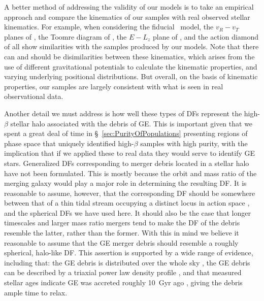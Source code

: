 A better method of addressing the validity of our models is to take an empirical approach and compare the kinematics of our samples with real observed stellar kinematics. For example, when considering the fiducial \survey\ model, the $v_{R}-v_{T}$ planes of \citet{belokurov18,fattahi19,naidu20}, the Toomre diagram of \citet{helmi18,koppelman19b}, the $E-L_{z}$ plane of \citet{helmi18,koppelman19b,naidu20}, and the action diamond of \citep[normalized to be a circle, ][]{naidu20} all show similarities with the samples produced by our models. Note that there can and should be disimilarities between these kinematics, which arises from the use of different gravitational potentials to calculate the kinematic properties, and varying underlying positional distributions. But overall, on the basis of kinematic properties, our samples are largely consistent with what is seen in real observational data.

Another detail we must address is how well these types of DFs represent the high-$\beta$ stellar halo associated with the debris of GE. This is important given that we spent a great deal of time in \S~\ref{sec:PurityOfPopulations} presenting regions of phase space that uniquely identified high-$\beta$ samples with high purity, with the implication that if we applied these to real data they would serve to identify GE stars. Generalized DFs corresponding to merger debris located in a stellar halo have not been formulated. This is mostly because the orbit and mass ratio of the merging galaxy would play a major role in determining the resulting DF. It is reasonable to assume, however, that the corresponding DF should be somewhere between that of a thin tidal stream occupying a distinct locus in action space \citep[e.g.][]{bovy14}, and the spherical DFs we have used here. It should also be the case that longer timescales and larger mass ratio mergers tend to make the DF of the debris resemble the latter, rather than the former. With this in mind we believe it reasonable to assume that the GE merger debris should resemble a roughly spherical, halo-like DF. This assertion is supported by a wide range of evidence, including that: the GE debris is distributed over the whole sky \citep[see Figure 12 in ][]{helmi20}, the GE debris can be described by a triaxial power law density profile \citep{mackereth20}, and that measured stellar ages indicate GE was accreted roughly 10~Gyr ago \citep{montalban20}, giving the debris ample time to relax.

